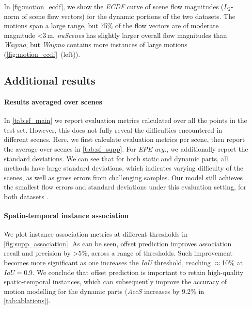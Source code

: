 In \cref{fig:motion_ecdf}, we show the \textit{ECDF} curve of scene flow magnitudes ($L_2$-norm of scene flow vectors) for the dynamic portions of the two datasets. The motions span a large range, but 75\% of the flow vectors are of moderate magnitude \textless3$\,$m. \emph{nuScenes} has slightly larger overall flow magnitudes than \emph{Waymo}, but \emph{Waymo} contains more instances of large motions (\cref{fig:motion_ecdf}~(left)).


\subsection{Additional results}
\label{sec:supp_quan}
\paragraph{Results averaged over scenes}
In \cref{tab:sf_main} we report evaluation metrics calculated over all the points in the test set. However, this does not fully reveal the difficulties encountered in different scenes. Here, we first calculate evaluation metrics per scene, then report the average over scenes in \cref{tab:sf_supp}. For \textit{EPE avg.}, we additionally report the standard deviations. We can see that for both static and dynamic parts, all methods have large standard deviations, which indicates varying difficulty of the scenes, as well as gross errors from challenging samples. Our model still achieves the smallest flow errors and standard deviations under this evaluation setting, for both datasets . 


\paragraph{Spatio-temporal instance association}

We plot instance association metrics at different thresholds in \cref{fig:supp_association}. As can be seen, offset prediction improves association recall and precision by \textgreater5\%, across a range of thresholds. Such improvement becomes more significant as one increases the \textit{IoU} threshold, reaching $\approx$10\% at $IoU=0.9$. We conclude that offset prediction is important to retain high-quality spatio-temporal instances, which can subsequently improve the accuracy of motion modelling for the dynamic parts (\textit{AccS} increases by 9.2\%  in \cref{tab:ablations}).



